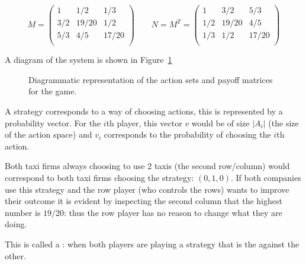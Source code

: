 \[
   M =
        \begin{pmatrix}
            1     & 1 / 2   & 1 / 3 \\
            3 / 2 & 19 / 20 & 1 / 2 \\
            5 / 3 & 4 / 5   & 17 / 20\\
        \end{pmatrix}
   \qquad
   N = M ^T =
        \begin{pmatrix}
            1     & 3 / 2   & 5 / 3 \\
            1 / 2 & 19 / 20 & 4 / 5 \\
            1 / 3 & 1 / 2   & 17 / 20\\
        \end{pmatrix}
\]

A diagram of the system is shown in Figure~\ref{fig:taxi-firm-game}

\begin{figure}
\begin{center}

\end{center}
\caption{Diagrammatic representation of the action sets and payoff matrices for
    the game.}
\label{fig:taxi-firm-game}
\end{figure}

A strategy corresponds to a way of choosing actions, this is represented by a
probability vector. For the \(i\)th player, this vector \(v\) would be of size
\(|A_i|\) (the size of the action space) and \(v_i\) corresponds to the
probability of choosing the \(i\)th action.

Both taxi firms always choosing to use 2 taxis (the second row/column) would
correspond to both taxi firms choosing the strategy: \((0, 1, 0)\). 
If both companies use this strategy and the row player (who controls the
rows) wants to improve their outcome it is evident by inspecting the second
column that the highest number is \(19 / 20\): thus the row player has no reason
to change what they are doing.

This is called a : when both players are playing a
strategy that is the  against the other.

